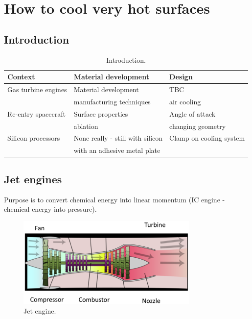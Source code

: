 \chapter{How to cool very hot surfaces}
\section{Introduction}
\begin{table}[H]
    \centering
    \begin{tabular}{@{}lll@{}}
        \toprule
        \textbf{Context}    & \textbf{Material development}    & \textbf{Design}         \\
        \midrule
        Gas turbine engines & Material development             & TBC                     \\
                            & manufacturing techniques         & air cooling             \\
        Re-entry spacecraft & Surface properties               & Angle of attack         \\
                            & ablation                         & changing geometry       \\
        Silicon processors  & None really - still with silicon & Clamp on cooling system \\
                            & with an adhesive metal plate                               \\
        \bottomrule
    \end{tabular}
    \caption{Introduction.}
\end{table}
\section{Jet engines}
Purpose is to convert chemical energy into linear momentum (IC engine - chemical energy into pressure).
\begin{figure}[H]
    \centering
    \includegraphics[width = 0.8\textwidth]{img/figure19.png}
    \caption{Jet engine.}
\end{figure}
